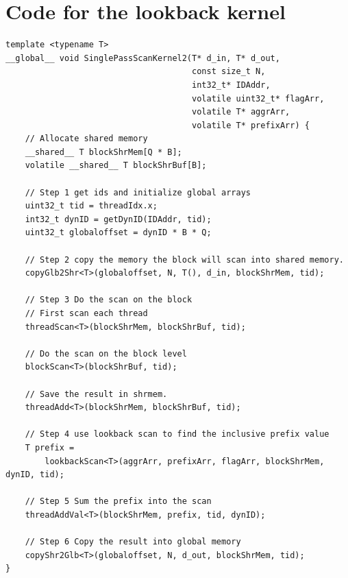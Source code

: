 \documentclass[twocolumn]{article}
\begin{document}
\appendix

\section{Code for the lookback kernel}

\begin{lstlisting}[caption=Lookback kernel,label=lst:lookbackKernel]
template <typename T>
__global__ void SinglePassScanKernel2(T* d_in, T* d_out,
                                      const size_t N,
                                      int32_t* IDAddr,
                                      volatile uint32_t* flagArr,
                                      volatile T* aggrArr,
                                      volatile T* prefixArr) {
    // Allocate shared memory
    __shared__ T blockShrMem[Q * B];
    volatile __shared__ T blockShrBuf[B];

    // Step 1 get ids and initialize global arrays
    uint32_t tid = threadIdx.x;
    int32_t dynID = getDynID(IDAddr, tid);
    uint32_t globaloffset = dynID * B * Q;

    // Step 2 copy the memory the block will scan into shared memory.
    copyGlb2Shr<T>(globaloffset, N, T(), d_in, blockShrMem, tid);

    // Step 3 Do the scan on the block
    // First scan each thread
    threadScan<T>(blockShrMem, blockShrBuf, tid);

    // Do the scan on the block level
    blockScan<T>(blockShrBuf, tid);

    // Save the result in shrmem.
    threadAdd<T>(blockShrMem, blockShrBuf, tid);

    // Step 4 use lookback scan to find the inclusive prefix value
    T prefix =
        lookbackScan<T>(aggrArr, prefixArr, flagArr, blockShrMem, dynID, tid);

    // Step 5 Sum the prefix into the scan
    threadAddVal<T>(blockShrMem, prefix, tid, dynID);

    // Step 6 Copy the result into global memory
    copyShr2Glb<T>(globaloffset, N, d_out, blockShrMem, tid);
}
\end{lstlisting}

\newpage
\end{document}
